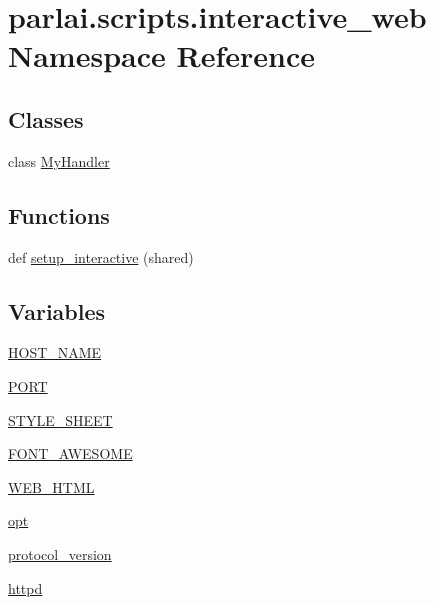 \hypertarget{namespaceparlai_1_1scripts_1_1interactive__web}{}\section{parlai.\+scripts.\+interactive\+\_\+web Namespace Reference}
\label{namespaceparlai_1_1scripts_1_1interactive__web}
\subsection*{Classes}
\begin{DoxyCompactItemize}
\item 
class \hyperlink{classparlai_1_1scripts_1_1interactive__web_1_1MyHandler}{My\+Handler}
\end{DoxyCompactItemize}
\subsection*{Functions}
\begin{DoxyCompactItemize}
\item 
def \hyperlink{namespaceparlai_1_1scripts_1_1interactive__web_abeab09cab4f9e60077ffd5050bff36ef}{setup\+\_\+interactive} (shared)
\end{DoxyCompactItemize}
\subsection*{Variables}
\begin{DoxyCompactItemize}
\item 
\hyperlink{namespaceparlai_1_1scripts_1_1interactive__web_a1be4376232ba5fb34748515c98894038}{H\+O\+S\+T\+\_\+\+N\+A\+ME}
\item 
\hyperlink{namespaceparlai_1_1scripts_1_1interactive__web_ad1ac15c0fba2939e2421dfcc793f3659}{P\+O\+RT}
\item 
\hyperlink{namespaceparlai_1_1scripts_1_1interactive__web_a7ef47952fffbf40ad8526e0513fc3484}{S\+T\+Y\+L\+E\+\_\+\+S\+H\+E\+ET}
\item 
\hyperlink{namespaceparlai_1_1scripts_1_1interactive__web_a57f348eaa99e66b04a8aeb54762adcfd}{F\+O\+N\+T\+\_\+\+A\+W\+E\+S\+O\+ME}
\item 
\hyperlink{namespaceparlai_1_1scripts_1_1interactive__web_af3bf0959c45adea28e896999ca4cbf48}{W\+E\+B\+\_\+\+H\+T\+ML}
\item 
\hyperlink{namespaceparlai_1_1scripts_1_1interactive__web_a500c0505acc64a8a9fc5d63999064b89}{opt}
\item 
\hyperlink{namespaceparlai_1_1scripts_1_1interactive__web_a8a3d9062157e9703a21ded9885420c12}{protocol\+\_\+version}
\item 
\hyperlink{namespaceparlai_1_1scripts_1_1interactive__web_af01d14f8f733bc94f7aaab006021b83b}{httpd}
\end{DoxyCompactItemize}


